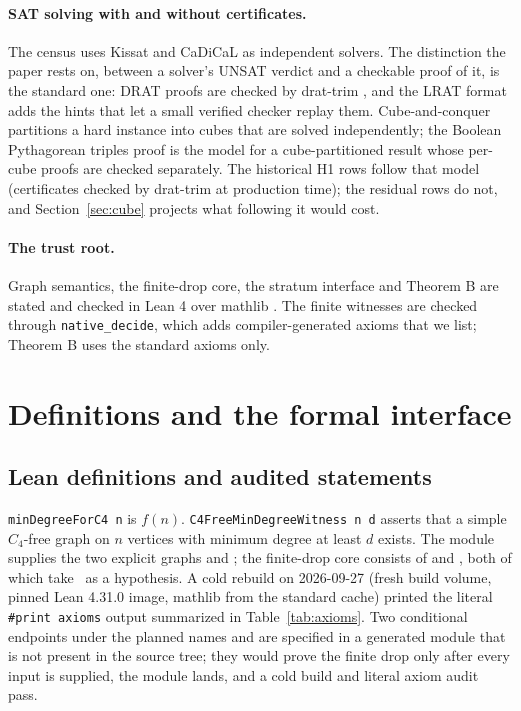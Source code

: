 \documentclass{anvil-paper}
\newcommand{\hnoFortyNine}{\lean{hno49}}
\theoremstyle{definition}
\begin{document}
\paragraph{SAT solving with and without certificates.} The census uses Kissat \citep{biere2024kissat} and CaDiCaL \citep{biere2020cadical} as independent solvers. The distinction the paper rests on, between a solver's UNSAT verdict and a checkable proof of it, is the standard one: DRAT proofs are checked by drat-trim \citep{wetzler2014drat}, and the LRAT format \citep{cruzfilipe2017lrat} adds the hints that let a small verified checker replay them. Cube-and-conquer \citep{heule2011cube} partitions a hard instance into cubes that are solved independently; the Boolean Pythagorean triples proof \citep{heule2016pythagorean} is the model for a cube-partitioned result whose per-cube proofs are checked separately. The historical H1 rows follow that model (certificates checked by drat-trim at production time); the residual rows do not, and Section~\ref{sec:cube} projects what following it would cost.

\paragraph{The trust root.} Graph semantics, the finite-drop core, the stratum interface and Theorem B are stated and checked in Lean 4 \citep{moura2021lean4} over mathlib \citep{mathlib2020}. The finite witnesses are checked through \texttt{native\_decide}, which adds compiler-generated axioms that we list; Theorem B uses the standard axioms only.

\section{Definitions and the formal interface}\label{sec:prelim}

\subsection{Lean definitions and audited statements}\label{sec:lean-defs}

\texttt{minDegreeForC4 n} is $f(n)$. \texttt{C4FreeMinDegreeWitness n d} asserts that a simple $C_4$-free graph on $n$ vertices with minimum degree at least $d$ exists. The module  supplies the two explicit graphs  and ; the finite-drop core consists of  and , both of which take \hnoFortyNine\ as a hypothesis. A cold rebuild on 2026-09-27 (fresh build volume, pinned Lean 4.31.0 image, mathlib from the standard cache) printed the literal \texttt{\#print axioms} output summarized in Table~\ref{tab:axioms}. Two conditional endpoints under the planned names  and  are specified in a generated module that is not present in the source tree; they would prove the finite drop only after every input is supplied, the module lands, and a cold build and literal axiom audit pass.
\end{document}
